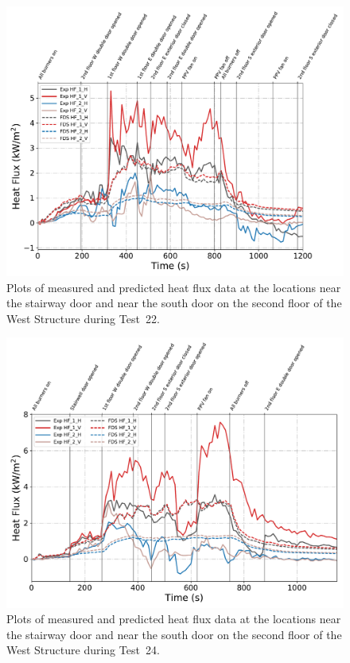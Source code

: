 \begin{figure}[!h]
	\centering
	\includegraphics[width=\columnwidth]{Figures/Plots/Validation/Heat_Flux/Test_22_HFs}
	\caption[Plots of measured and predicted heat flux data during Test~22.]{Plots of measured and predicted heat flux data at the locations near the stairway door and near the south door on the second floor of the West Structure during Test~22.}
	\label{fig:Test22_HFs}
\end{figure}

\begin{figure}[!h]
	\centering
	\includegraphics[width=\columnwidth]{Figures/Plots/Validation/Heat_Flux/Test_24_HFs}
	\caption[Plots of measured and predicted heat flux data during Test~24.]{Plots of measured and predicted heat flux data at the locations near the stairway door and near the south door on the second floor of the West Structure during Test~24.}
	\label{fig:Test24_HFs}
\end{figure}

